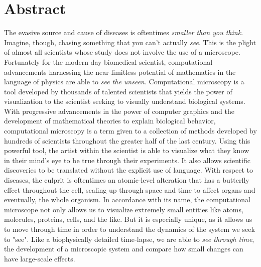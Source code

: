 \documentclass[12pt]{ucsddissertation}
\begin{document}
\section{Abstract}
The evasive source and cause of diseases is oftentimes \textit{smaller than you think}. Imagine, though, chasing something that you can't actually \textit{see}. This is the plight of almost all scientists whose study does not involve the use of a microscope. Fortunately for the modern-day biomedical scientist, computational advancements harnessing the near-limitless potential of mathematics in the language of physics are able to \textit{see the unseen}.
Computational microscopy is a tool developed by thousands of talented scientists that yields the power of visualization to the scientist seeking to visually understand biological systems. With progressive advancements in the power of computer graphics and the development of mathematical theories to explain biological behavior, computational microscopy is a term given to a collection of methods developed by hundreds of scientists throughout the greater half of the last century. Using this powerful tool, the artist within the scientist is able to visualize what they know in their mind's eye to be true through their experiments. It also allows scientific discoveries to be translated without the explicit use of language. With respect to diseases, the culprit is oftentimes an atomic-level alteration that has a butterfly effect throughout the cell, scaling up through space and time to affect organs and eventually, the whole organism. In accordance with its name, the computational microscope not only allows us to visualize extremely small entities like atoms, molecules, proteins, cells, and the like. But it is especially unique, as it allows us to move through time in order to understand the dynamics of the system we seek to "see". Like a biophysically detailed time-lapse, we are able to \textit{see through time}, the development of a microscopic system and compare how small changes can have large-scale effects. 
\end{document}
